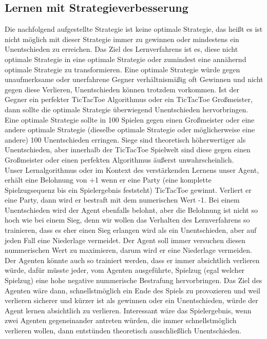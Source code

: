 \subsection{Lernen mit Strategieverbesserung}
Die nachfolgend aufgestellte Strategie ist keine optimale Strategie, das heißt es ist nicht möglich mit dieser Strategie immer zu gewinnen oder mindestens ein Unentschieden zu erreichen. Das Ziel des Lernverfahrens ist es, diese nicht optimale Strategie in eine optimale Strategie oder zumindest eine annähernd optimale Strategie zu transformieren. Eine optimale Strategie würde gegen unaufmerksame oder unerfahrene Gegner verhältnismäßig oft Gewinnen und nicht gegen diese Verlieren, Unentschieden können trotzdem vorkommen. Ist der Gegner ein perfekter TicTacToe Algorithmus oder ein TicTacToe Großmeister, dann sollte die optimale Strategie überwiegend Unentschieden hervorbringen. Eine optimale Strategie sollte in 100 Spielen gegen einen Großmeister oder eine andere optimale Strategie (dieselbe optimale Strategie oder möglicherweise eine andere) 100 Unentschieden erringen. Siege sind theoretisch höherwertiger als Unentschieden, aber innerhalb der TicTacToe Spielwelt sind diese gegen einen Großmeister oder einen perfekten Algorithmus äußerst unwahrscheinlich. \\

Unser Lernalgorithmus oder im Kontext des verstärkenden Lernens unser Agent, erhält eine Belohnung von +1 wenn er eine Party (eine komplette Spielzugsequenz bis ein Spielergebnis feststeht) TicTacToe gewinnt. Verliert er eine Party, dann wird er bestraft mit dem numerischen Wert -1. Bei einem Unentschieden wird der Agent ebenfalls belohnt, aber die Belohnung ist nicht so hoch wie bei einem Sieg, denn wir wollen das Verhalten des Lernverfahrens so trainieren, dass es eher einen Sieg erlangen wird als ein Unentschieden, aber auf jeden Fall eine Niederlage vermeidet. Der Agent soll immer versuchen diesen nummerischen Wert zu maximieren, darum wird er eine Niederlage vermeiden. Der Agenten könnte auch so trainiert werden, dass er immer absichtlich verlieren würde, dafür müsste jeder, vom Agenten ausgeführte, Spielzug (egal welcher Spielzug) eine hohe negative nummerische Bestrafung hervorbringen. Das Ziel des Agenten wäre dann, schnellstmöglich ein Ende des Spiels zu provozieren und weil verlieren sicherer und kürzer ist als gewinnen oder ein Unentschieden, würde der Agent lernen absichtlich zu verlieren. Interessant wäre das Spielergebnis, wenn zwei Agenten gegeneinander antreten würden, die immer schnellstmöglich verlieren wollen, dann entstünden theoretisch ausschließlich Unentschieden.


